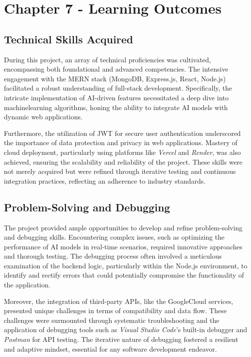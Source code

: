 \section{Chapter 7 - Learning Outcomes}
\subsection{Technical Skills Acquired}
During this project, an array of technical proficiencies was cultivated, encompassing both foundational and advanced competencies. The intensive engagement with the \gls{MERN} stack (\gls{MongoDB}, \gls{Express.js}, \gls{React}, \gls{Node.js}) facilitated a robust understanding of full-stack development. Specifically, the intricate implementation of \gls{AI}-driven features necessitated a deep dive into \gls{machinelearning} algorithms, honing the ability to integrate \gls{AI} models with dynamic web applications.

Furthermore, the utilization of \gls{JWT} for secure user authentication underscored the importance of data protection and privacy in web applications. Mastery of cloud deployment, particularly using platforms like \textit{Vercel} and \textit{Render}, was also achieved, ensuring the scalability and reliability of the project. These skills were not merely acquired but were refined through iterative testing and continuous integration practices, reflecting an adherence to industry standards.


\subsection{Problem-Solving and Debugging}
The project provided ample opportunities to develop and refine problem-solving and debugging skills. Encountering complex issues, such as optimizing the performance of \gls{AI} models in real-time scenarios, required innovative approaches and thorough testing. The debugging process often involved a meticulous examination of the backend logic, particularly within the \gls{Node.js} environment, to identify and rectify errors that could potentially compromise the functionality of the application.

Moreover, the integration of third-party APIs, like the \gls{GoogleCloud} services, presented unique challenges in terms of compatibility and data flow. These challenges were surmounted through systematic troubleshooting and the application of debugging tools such as \textit{Visual Studio Code}'s built-in debugger and \textit{Postman} for API testing. The iterative nature of debugging fostered a resilient and adaptive mindset, essential for any software development endeavor.

